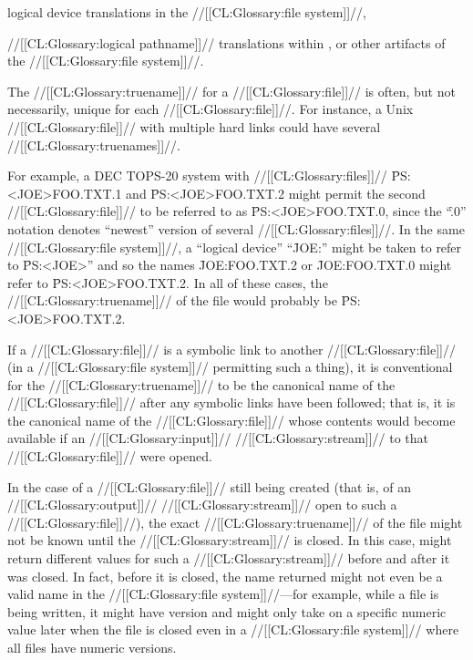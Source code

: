      logical device translations in the //[[CL:Glossary:file system]]//,

     //[[CL:Glossary:logical pathname]]// translations within \clisp,
  or other artifacts of the //[[CL:Glossary:file system]]//.

The //[[CL:Glossary:truename]]// for a //[[CL:Glossary:file]]// is often, but not necessarily, unique for
each //[[CL:Glossary:file]]//.  For instance, a Unix //[[CL:Glossary:file]]// with multiple hard links 
could have several //[[CL:Glossary:truenames]]//.


For example, a DEC TOPS-20 system with //[[CL:Glossary:files]]// \f{PS:<JOE>FOO.TXT.1} 
and \f{PS:<JOE>FOO.TXT.2} might permit the second //[[CL:Glossary:file]]// to be referred
to as \f{PS:<JOE>FOO.TXT.0}, since the ``\f{.0}'' notation denotes ``newest''
version of several //[[CL:Glossary:files]]//.
In the same //[[CL:Glossary:file system]]//, a ``logical device'' ``\f{JOE:}'' might be 
taken to refer to \f{PS:<JOE>}'' and so the names \f{JOE:FOO.TXT.2} or
\f{JOE:FOO.TXT.0} might refer to \f{PS:<JOE>FOO.TXT.2}.
In all of these cases, the //[[CL:Glossary:truename]]// of the file would probably be
\f{PS:<JOE>FOO.TXT.2}.

If a //[[CL:Glossary:file]]// is a symbolic link to another //[[CL:Glossary:file]]// (in a //[[CL:Glossary:file system]]//
permitting such a thing), it is conventional for the //[[CL:Glossary:truename]]// to be
the canonical name of the //[[CL:Glossary:file]]// after any symbolic links have been followed;
that is, it is the canonical name of the //[[CL:Glossary:file]]// whose contents would
become available if an //[[CL:Glossary:input]]// //[[CL:Glossary:stream]]// to that //[[CL:Glossary:file]]// were 
opened.

In the case of a //[[CL:Glossary:file]]// still being created (that is, of an //[[CL:Glossary:output]]//
//[[CL:Glossary:stream]]// open to such a //[[CL:Glossary:file]]//), the exact //[[CL:Glossary:truename]]// of the file
might not be known until the //[[CL:Glossary:stream]]// is closed.  In this case, 
 might return different values for such a //[[CL:Glossary:stream]]//
before and after it was closed.  In fact, before it is closed, the name returned
might not even be a valid name in the //[[CL:Glossary:file system]]//---for example, while a
file is being written, it might have version  and might only take on 
a specific numeric value later when the file is closed even in a //[[CL:Glossary:file system]]//
where all files have numeric versions.

\endsubsubsection%

\endsubsection%
